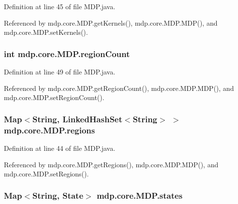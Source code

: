 Definition at line 45 of file M\+D\+P.\+java.



Referenced by mdp.\+core.\+M\+D\+P.\+get\+Kernels(), mdp.\+core.\+M\+D\+P.\+M\+D\+P(), and mdp.\+core.\+M\+D\+P.\+set\+Kernels().

\hypertarget{classmdp_1_1core_1_1_m_d_p_ae2644b9387e09a5c2ab096c0bb519f8d}{}
\subsubsection[{region\+Count}]{\setlength{\rightskip}{0pt plus 5cm}int mdp.\+core.\+M\+D\+P.\+region\+Count\hspace{0.3cm}{\ttfamily [private]}}\label{classmdp_1_1core_1_1_m_d_p_ae2644b9387e09a5c2ab096c0bb519f8d}


Definition at line 49 of file M\+D\+P.\+java.



Referenced by mdp.\+core.\+M\+D\+P.\+get\+Region\+Count(), mdp.\+core.\+M\+D\+P.\+M\+D\+P(), and mdp.\+core.\+M\+D\+P.\+set\+Region\+Count().

\hypertarget{classmdp_1_1core_1_1_m_d_p_a79761e7b3bb0d7a083bee7183c992893}{}
\subsubsection[{regions}]{\setlength{\rightskip}{0pt plus 5cm}Map$<$String, Linked\+Hash\+Set$<$String$>$ $>$ mdp.\+core.\+M\+D\+P.\+regions\hspace{0.3cm}{\ttfamily [private]}}\label{classmdp_1_1core_1_1_m_d_p_a79761e7b3bb0d7a083bee7183c992893}


Definition at line 44 of file M\+D\+P.\+java.



Referenced by mdp.\+core.\+M\+D\+P.\+get\+Regions(), mdp.\+core.\+M\+D\+P.\+M\+D\+P(), and mdp.\+core.\+M\+D\+P.\+set\+Regions().

\hypertarget{classmdp_1_1core_1_1_m_d_p_a62bf7674d88162db7d00cfd82603b24f}{}
\subsubsection[{states}]{\setlength{\rightskip}{0pt plus 5cm}Map$<$String, {\bf State}$>$ mdp.\+core.\+M\+D\+P.\+states\hspace{0.3cm}{\ttfamily [private]}}\label{classmdp_1_1core_1_1_m_d_p_a62bf7674d88162db7d00cfd82603b24f}


